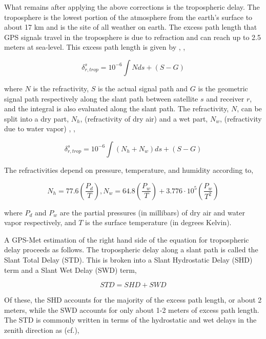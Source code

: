 \documentclass[proposal]{umassthesis}
\begin{document}
{What remains after applying the above corrections is the tropospheric delay. The troposphere is the lowest portion of the atmosphere from the earth's surface to about 17 km and is the site of all weather on earth. The excess path length that GPS signals travel in the troposphere is due to refraction and can reach up to 2.5 meters at sea-level. This excess path length is given by \cite{bevis1992gps}, \cite{ming2014},
 
\begin{equation}
\delta_{r,trop}^s = 10^{-6} \int N ds + (S - G)
\end{equation}

where $N$ is the refractivity, $S$ is the actual signal path and $G$ is the geometric signal path respectively along the slant path between satellite $s$ and receiver $r$, and the integral is also evaluated along the slant path. The refractivity, $N$, can be split into a dry part, $N_h$, (refractivity of dry air) and a wet part, $N_w$, (refractivity due to water vapor) \cite{davis1985geodesy}, \cite{saastamoinen1972atmospheric},

\begin{equation}
\delta_{r,trop}^s = 10^{-6} \int (N_h + N_w) ds + (S - G)
\end{equation}

The refractivities depend on pressure, temperature, and humidity according to,

\begin{equation}
N_h = 77.6 (\dfrac{P_d}{T}), N_w = 64.8 (\dfrac{P_w}{T}) + 3.776 \cdot 10^{5} (\dfrac{P_w}{T^2})
\end{equation}

where $P_d$ and $P_w$ are the partial pressures (in millibars) of dry air and water vapor respectively, and $T$ is the surface temperature (in degrees Kelvin).

A GPS-Met estimation of the right hand side of the equation for tropospheric delay proceeds as follows. The tropospheric delay along a slant path is called the Slant Total Delay (STD). This is broken into a Slant Hydrostatic Delay (SHD) term and a Slant Wet Delay (SWD) term,

\begin{equation}
STD = SHD + SWD
\end{equation}

Of these, the SHD accounts for the majority of the excess path length, or about 2 meters, while the SWD accounts for only about 1-2 meters of excess path length. The STD is commonly written in terms of the hydrostatic and wet delays in the zenith direction as (cf.\cite{duan1996gps}),

}
\end{document}
